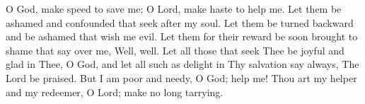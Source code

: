 O God, make speed to save me; O Lord, make haste to help me. Let them be ashamed and confounded that seek after my soul. Let them be turned backward and be ashamed that wish me evil. Let them for their reward be soon brought to shame that say over me, Well, well. Let all those that seek Thee be joyful and glad in Thee, O God, and let all such as delight in Thy salvation say always, The Lord be praised. But I am poor and needy, O God; help me! Thou art my helper and my redeemer, O Lord; make no long tarrying.
